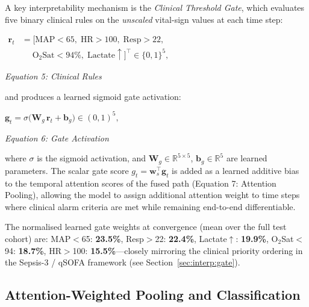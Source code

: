 \documentclass[conference,12pt]{IEEEtran}
\newcommand{\sect}[1]{Section~\ref{#1}}
\begin{document}
A key interpretability mechanism is the \emph{Clinical Threshold Gate}, which
evaluates five binary clinical rules on the \emph{unscaled} vital-sign values
at each time step:
%
\vspace{1em}
\begin{center}
  $\displaystyle
  \boxed{
  \begin{aligned}
  \mathbf{r}_t
    &= \bigl[
        \mathrm{MAP}{<}65,\;
        \mathrm{HR}{>}100,\;
        \mathrm{Resp}{>}22,\; \\
    &\quad\;
        \mathrm{O_2Sat}{<}94\%,\;
        \mathrm{Lactate}{\uparrow}
      \bigr]^{\!\top}
    \in \{0,1\}^5,
  \end{aligned}
  }
  $
  \vspace{0.5em}
  
  \textit{Equation 5: Clinical Rules}
\end{center}
\vspace{1em}
%
and produces a learned sigmoid gate activation:
%
\vspace{1em}
\begin{center}
  $\displaystyle
  \boxed{
  \mathbf{g}_t
    = \sigma\!\bigl(\mathbf{W}_g\,\mathbf{r}_t + \mathbf{b}_g\bigr)
    \in (0,1)^5,
  }
  $
  \vspace{0.5em}
  
  \textit{Equation 6: Gate Activation}
\end{center}
\vspace{1em}
%
where $\sigma$ is the sigmoid activation, and
$\mathbf{W}_g \in \mathbb{R}^{5 \times 5}$,
$\mathbf{b}_g \in \mathbb{R}^5$ are learned parameters.
The scalar gate score $g_t = \mathbf{w}_s^{\top}\mathbf{g}_t$ is added as a
learned additive bias to the temporal attention scores of the fused path
(Equation 7: Attention Pooling), allowing the model to assign additional attention weight to
time steps where clinical alarm criteria are met while remaining end-to-end
differentiable.

The normalised learned gate weights at convergence (mean over the full test
cohort) are: MAP$<$65: \textbf{23.5\%}, Resp$>$22: \textbf{22.4\%},
Lactate$\uparrow$: \textbf{19.9\%}, O$_2$Sat$<$94: \textbf{18.7\%},
HR$>$100: \textbf{15.5\%}---closely mirroring the clinical priority ordering
in the Sepsis-3 / qSOFA framework (see \sect{sec:interp:gate}).

\subsection{\textbf{Attention-Weighted Pooling and Classification}}
\label{sec:pool}
\end{document}

